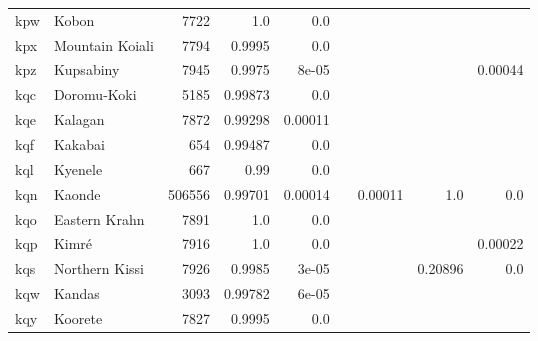 \documentclass[11pt]{article}
\begin{document}
\begin{table*}[h]
{\begin{tabular}{llrrrrrrr}
kpw         & Kobon         & 7722         & 1.0         & 0.0         &          &          &          &          \\

kpx         & Mountain Koiali         & 7794         & 0.9995         & 0.0         &          &          &          &          \\

kpz         & Kupsabiny         & 7945         & 0.9975         & 8e-05         &          &          &          & 0.00044         \\

kqc         & Doromu-Koki         & 5185         & 0.99873         & 0.0         &          &          &          &          \\

kqe         & Kalagan         & 7872         & 0.99298         & 0.00011         &          &          &          &          \\

kqf         & Kakabai         & 654         & 0.99487         & 0.0         &          &          &          &          \\

kql         & Kyenele         & 667         & 0.99         & 0.0         &          &          &          &          \\

kqn         & Kaonde         & 506556         & 0.99701         & 0.00014         &          & 0.00011         & 1.0         & 0.0         \\

kqo         & Eastern Krahn         & 7891         & 1.0         & 0.0         &          &          &          &          \\

kqp         & Kimré         & 7916         & 1.0         & 0.0         &          &          &          & 0.00022         \\

kqs         & Northern Kissi         & 7926         & 0.9985         & 3e-05         &          &          & 0.20896         & 0.0         \\

kqw         & Kandas         & 3093         & 0.99782         & 6e-05         &          &          &          &          \\

kqy         & Koorete         & 7827         & 0.9995         & 0.0         &          &          &          &          \\


\end{tabular}}
\end{table*}
\end{document}
